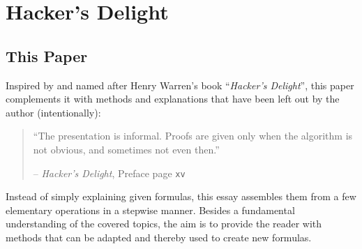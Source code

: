 \section{Hacker's Delight}\label{sec:book}
\subsection*{This Paper}
Inspired by and named after Henry Warren's book ``\emph{Hacker's Delight}''\cite{Warren:2012:HD:2462741},
this paper complements it with methods and explanations that have been left out by the author (intentionally):

\begin{quote}
``The presentation is informal. Proofs are given only when the algorithm is not obvious, and sometimes not even then.''

\hfill -- \emph{Hacker's Delight}, Preface page \texttt{xv} \cite{Warren:2012:HD:2462741}
\end{quote}

Instead of simply explaining given formulas,
this essay assembles them from a few elementary operations in a stepwise manner.
Besides a fundamental understanding of the covered topics,
the aim is to provide the reader with methods that can be adapted and thereby used to create new formulas.
